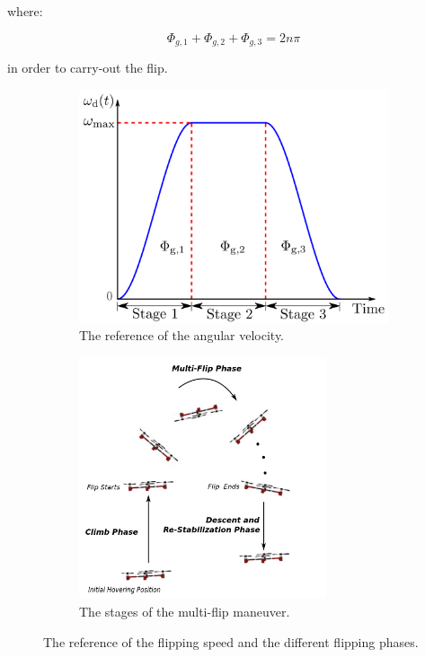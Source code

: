 \documentclass{thesisreport}
\begin{document}
\begin{enumerate}
where: 

\begin{equation}
	\Phi_{g,1} + \Phi_{g,2} + \Phi_{g,3} = 2 n \pi 
\end{equation}

in order to carry-out the flip.

	

 
 
\newpage

\begin{figure}[h]
     \centering
     \begin{subfigure}[b]{0.45\textwidth}
         \centering
         \includegraphics[width=\textwidth]{Images/Flip/Closed_Loop_a}
         \caption{The reference of the angular velocity.}
         \label{closed_loop_a}
     \end{subfigure}
     \hfill
     \begin{subfigure}[b]{0.45\textwidth}
         \centering
         \includegraphics[width=0.8\textwidth]{Images/Flip/Closed_Loop_b}
         \caption{The stages of the multi-flip maneuver.}
         \label{closed_loop_b}
     \end{subfigure}
        \caption{The reference of the flipping speed and the different flipping phases. \cite{Chen2016}}
        \label{closed_loop_c}
\end{figure}


\end{enumerate}
\end{document}
